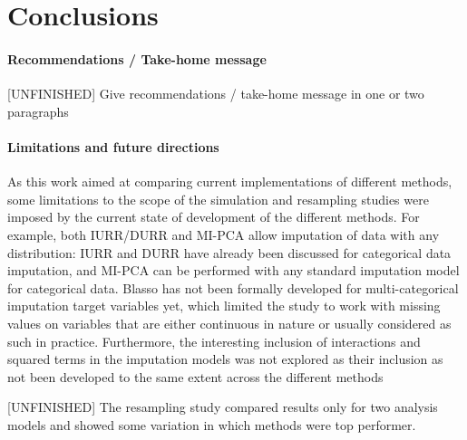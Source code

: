 \section{Conclusions}

\paragraph{Recommendations / Take-home message}
	[UNFINISHED] Give recommendations / take-home message in one or two paragraphs

\paragraph{Limitations and future directions}

	As this work aimed at comparing current implementations of different methods, some limitations
	to the scope of the simulation and resampling studies were imposed by the current state of development of 
	the different methods.
	For example, both IURR/DURR and MI-PCA allow imputation of data with any distribution:
	IURR and DURR have already been discussed for categorical data imputation,
	and MI-PCA can be performed with any standard imputation model for categorical data.
	Blasso has not been formally developed for multi-categorical imputation target variables yet, which limited 
	the study to work with missing values on variables that are either continuous in nature or usually considered
	as such in practice.
	Furthermore, the interesting inclusion of interactions and squared terms in the imputation models was
	not explored as their inclusion as not been developed to the same extent across the different methods 
	
	[UNFINISHED] The resampling study compared results only for two analysis models and showed some variation in
	which methods were top performer.

\iffalse 
	Some promising methods were excluded because their current implementation did not allow to meet
	the goals of this study.
	For example, BART is currently implemented to impute the covariates for a given analysis model.
	It assumes that the dependent variable is fully observed which is something that does not fit well
	with the application on social surveys where the dependent variable is as likely as any other to be 
	afflicted by missingness.
	Furthermore, it's reliance on the definition of an analsyis model before the imputation procedure can 
	be run is considered by the authors of this paper as an undesirable feature: in general, for imputation
	of social surveys there is a preference for imputation models that can be suggested independently of
	the type and formulation of the analysis model.
\fi
